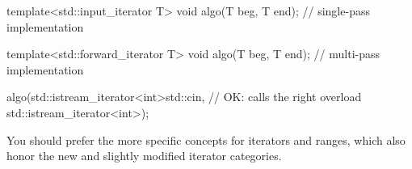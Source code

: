 \begin{cpp}
template<std::input_iterator T>
void algo(T beg, T end); // single-pass implementation
	
template<std::forward_iterator T>
void algo(T beg, T end); // multi-pass implementation

algo(std::istream_iterator<int>{std::cin}, // OK: calls the right overload
	std::istream_iterator<int>{});
\end{cpp}

You should prefer the more specific concepts for iterators and ranges, which also honor the new and slightly modified iterator categories.


















